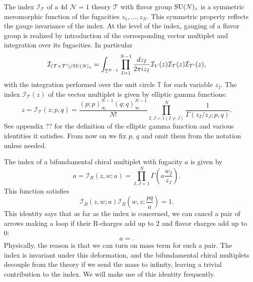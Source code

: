 The index $\mathcal{I}_{\mathcal{T}}$ of a 4d $\mathcal{N}=1$ theory
$\mathcal{T}$ with flavor group $\mathrm{SU}(N)_{z}$ is a symmetric meromorphic
function of the fugacities $z_{1},\ldots,z_{N}$. This symmetric property
reflects the gauge invariance of the index. At the level of the index,
gauging of a flavor group is realized by introduction of the corresponding
vector multiplet and integration over its fugacities. In particular
\begin{equation}
    \mathcal{I}_{\left(\mathcal{T}\times\mathcal{T}'\right)/\mathrm{SU}(N)_{z}}  
      =  \int_{\mathbb{T}^{N-1}}  \prod_{I=1}^{N-1}\frac{dz_{I}}{2\pi iz_{I}}
          \mathcal{I}_{V}(z)  \mathcal{I}_{\mathcal{T}}(z)  \mathcal{I}_{\mathcal{T}'}(z),
\end{equation}
 with the integration performed over the unit circle $\mathbb{T}$
for each variable $z_{I}$. The index $\mathcal{I}_{\mathcal{T}}(z)$
of the vector multiplet is given by elliptic gamma functions: 
\begin{equation}
    z  
      =  \mathcal{I}_{\mathcal{T}}(z;p,q)  
        =  \frac{\left(p;p\right)_{\infty}^{N-1}\left(q;q\right)_{\infty}^{N-1}}{N!}  
              \prod_{I,J=1(I\neq J)}^{N}\frac{1}{\Gamma(z_{I}/z_{J};p,q)}.
\end{equation}
See appendix ?? for the definition of the elliptic gamma function
and various identities it satisfies. From now on we fix $p,\,q$ and
omit them from the notation unless needed. 

The index of a bifundamental chiral multiplet with fugacity $a$ is
given by 
\begin{equation}
    a  
      =  \mathcal{I}_{B}(z,w;a)  
        =\prod_{I,J=1}^{N}\Gamma\left(a\frac{w_{I}}{z_{J}}\right).
\end{equation}
This function satisfies 
\begin{equation}
    \mathcal{I}_{B}(z,w;a)  \mathcal{I}_{B}  \left(w,z;\frac{pq}{a}\right)  
    =  1.
\end{equation}
This identity says that as far as the index is concerned, we can
cancel a pair of arrows making a loop if their R-charges add up to
$2$ and flavor charges add up to $0$: 
\begin{equation}
    a=.
\end{equation}
 Physically, the reason is that we can turn on mass term for such
a pair. The index is invariant under this deformation, and the bifundamental
chiral multiplets decouple from the theory if we send the mass to
infinity, leaving a trivial contribution to the index. We will make
use of this identity frequently. 

